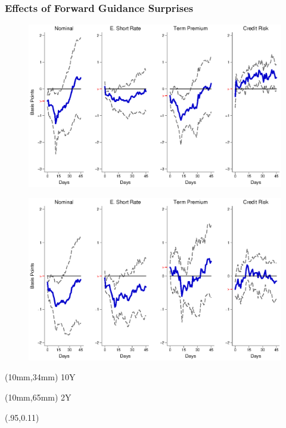 \documentclass[12pt, aspectratio=169, xcolor=dvipsnames]{beamer}  %
\begin{document}
\begin{frame}[label=FGEM]
	\frametitle{Effects of Forward Guidance Surprises}
	\begin{figure}[!htbp]
		\begin{center} %
			\includegraphics[trim={0cm 0cm 0cm 0cm},clip,height=0.4\textheight,width=0.85\linewidth]{../Figures/LPs/LagDep-FX/Path/EM/PathEMnomyptpphi120mPost.eps}
			\par\end{center}
	\end{figure}
	\vspace{-0.5cm}
	\begin{figure}[!htbp]
		\begin{center} %
			\includegraphics[trim={0cm 0cm 0cm 0.76cm},clip,height=0.4\textheight,width=0.85\linewidth]{../Figures/LPs/LagDep-FX/Path/EM/PathEMnomyptpphi24mPost.eps}
			\par\end{center}
	\end{figure}
	\begin{textblock*}{8mm}(10mm,34mm)
		\small 10Y
	\end{textblock*}
	\begin{textblock*}{8mm}(10mm,65mm)
		\small 2Y
	\end{textblock*}
	\begin{textblock*}{5cm}(.95\textwidth,0.11\textheight)
		\hyperlink{FGUS}{}
	\end{textblock*}
\end{frame}
\end{document}
